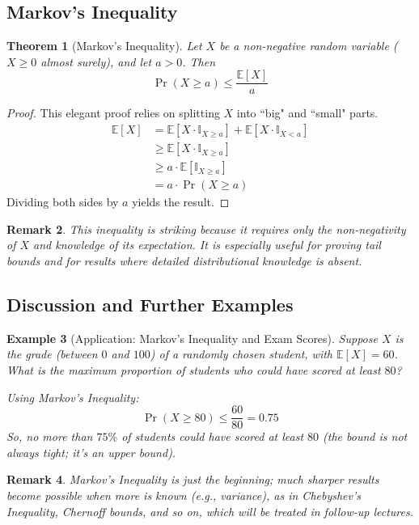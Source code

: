 \documentclass[12pt]{article}
\newtheorem{theorem}{Theorem}[section]
\newtheorem{remark}[theorem]{Remark}
\newtheorem{example}[theorem]{Example}
\newcommand{\indicator}{\mathbb{I}}
\begin{document}
\subsection{Markov's Inequality}

\begin{theorem}[Markov's Inequality]\label{thm:markov}
Let $X$ be a non-negative random variable ($X \geq 0$ almost surely), and let $a > 0$. Then
\[
    \Pr( X \geq a ) \leq \frac{\mathbb{E}[X]}{a}
\]
\end{theorem}

\begin{proof}
This elegant proof relies on splitting $X$ into ``big" and ``small" parts. 
\begin{align*}
    \mathbb{E}[X] 
    &= \mathbb{E}[ X \cdot \indicator_{X \geq a} ] + \mathbb{E}[ X \cdot \indicator_{X < a} ] \\
    &\geq \mathbb{E}[ X \cdot \indicator_{X \geq a} ] \\
    &\geq a \cdot \mathbb{E}[ \indicator_{X \geq a} ] \\
    &= a \cdot \Pr( X \geq a )
\end{align*}
Dividing both sides by $a$ yields the result.
\end{proof}

\begin{remark}
This inequality is striking because it requires only the non-negativity of $X$ and knowledge of its expectation. It is especially useful for proving tail bounds and for results where detailed distributional knowledge is absent.
\end{remark}

\subsection{Discussion and Further Examples}

\begin{example}[Application: Markov's Inequality and Exam Scores]
Suppose $X$ is the grade (between $0$ and $100$) of a randomly chosen student, with $\mathbb{E}[X] = 60$. What is the maximum proportion of students who could have scored at least $80$?

Using Markov's Inequality:
\[
\Pr( X \geq 80 ) \leq \frac{60}{80} = 0.75
\]
So, no more than $75\%$ of students could have scored at least $80$ (the bound is not always tight; it's an upper bound).
\end{example}

\begin{remark}
Markov's Inequality is just the beginning; much sharper results become possible when more is known (e.g., variance), as in Chebyshev's Inequality, Chernoff bounds, and so on, which will be treated in follow-up lectures.
\end{remark}
\end{document}
